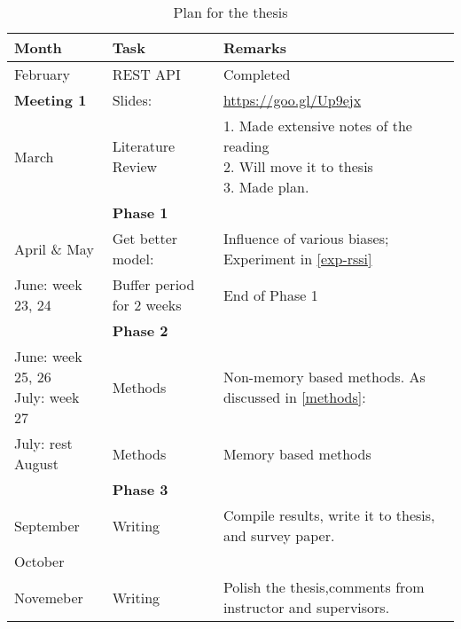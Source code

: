 \FloatBarrier
\begin{table}[H]
\centering
\caption{Plan for the thesis}
\label{tab-plan}
\begin{tabular}{|l|l|l|}
\hline
\textbf{Month}                   & \textbf{Task}                      & \textbf{Remarks}                                                                           \\ \hline
February                         & REST API                  & Completed                                                                         \\ \hline
\textbf{Meeting 1}               & Slides:     &  \url{https://goo.gl/Up9ejx}                                                                                 \\ \hline
March                            & Literature Review         & \shortstack[l]{1. Made extensive notes of the reading \\2. Will move it to thesis \\ 3. Made plan.} \\ \hline
                                 & \textbf{Phase 1}          &                                                                                   \\ \hline
April \& May                      & Get better model:       & Influence of various biases; Experiment in \ref{exp-rssi}                         \\ \hline
June: week 23, 24                & Buffer period for 2 weeks & End of Phase 1                                                                    \\ \hline
                                 & \textbf{Phase 2}          &                                                                                   \\ \hline
\shortstack[l]{June: week 25, 26\\July: week 27} & Methods                   & Non-memory based methods. As discussed in \ref{methods}:                          \\ \hline
\shortstack[l]{July: rest \\August}              & Methods                   & Memory based methods                                                              \\ \hline
                                 & \textbf{Phase 3}          &                                                                                   \\ \hline
September                        & Writing                   & Compile results, write it to thesis, and survey paper.                         \\ \hline
October & \\Novemeber            & Writing                   & Polish the thesis,comments from instructor and supervisors.                       \\ \hline
\end{tabular}
\end{table}
